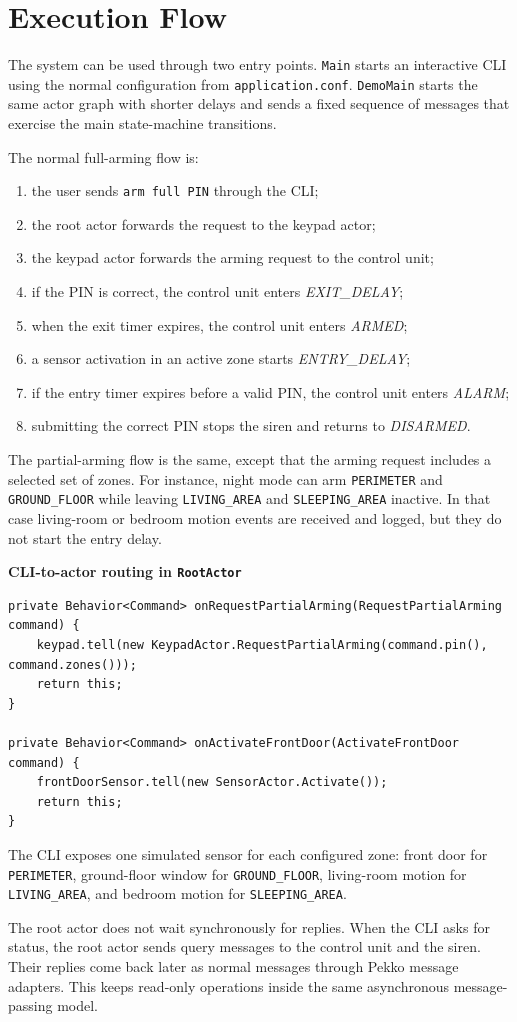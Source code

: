 \section{Execution Flow}

The system can be used through two entry points.
\texttt{Main} starts an interactive CLI using the normal configuration from \texttt{application.conf}.
\texttt{DemoMain} starts the same actor graph with shorter delays and sends a fixed sequence of messages that exercise
the main state-machine transitions.

The normal full-arming flow is:
\begin{enumerate}
    \item the user sends \texttt{arm full PIN} through the CLI;
    \item the root actor forwards the request to the keypad actor;
    \item the keypad actor forwards the arming request to the control unit;
    \item if the PIN is correct, the control unit enters \textit{EXIT\_DELAY};
    \item when the exit timer expires, the control unit enters \textit{ARMED};
    \item a sensor activation in an active zone starts \textit{ENTRY\_DELAY};
    \item if the entry timer expires before a valid PIN, the control unit enters \textit{ALARM};
    \item submitting the correct PIN stops the siren and returns to \textit{DISARMED}.
\end{enumerate}

The partial-arming flow is the same, except that the arming request includes a selected set of zones.
For instance, night mode can arm \texttt{PERIMETER} and \texttt{GROUND\_FLOOR} while leaving
\texttt{LIVING\_AREA} and \texttt{SLEEPING\_AREA} inactive.
In that case living-room or bedroom motion events are received and logged, but they do not start the entry delay.

\medskip

\noindent\textbf{CLI-to-actor routing in \texttt{RootActor}}
\begin{lstlisting}[style=reportcode]
private Behavior<Command> onRequestPartialArming(RequestPartialArming command) {
    keypad.tell(new KeypadActor.RequestPartialArming(command.pin(), command.zones()));
    return this;
}

private Behavior<Command> onActivateFrontDoor(ActivateFrontDoor command) {
    frontDoorSensor.tell(new SensorActor.Activate());
    return this;
}
\end{lstlisting}

The CLI exposes one simulated sensor for each configured zone: front door for \texttt{PERIMETER}, ground-floor window for
\texttt{GROUND\_FLOOR}, living-room motion for \texttt{LIVING\_AREA}, and bedroom motion for
\texttt{SLEEPING\_AREA}.

The root actor does not wait synchronously for replies.
When the CLI asks for status, the root actor sends query messages to the control unit and the siren.
Their replies come back later as normal messages through Pekko message adapters.
This keeps read-only operations inside the same asynchronous message-passing model.
